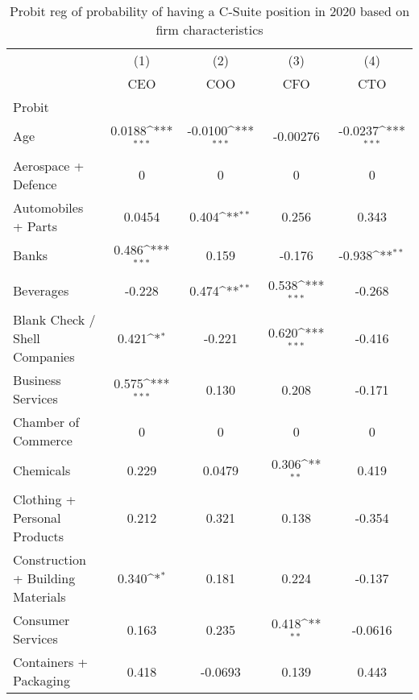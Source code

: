 {
\def\sym#1{\ifmmode^{#1}\else\(^{#1}\)\fi}
\begin{longtable}{l*{4}{c}}
\caption{Probit reg of probability of having a C-Suite position in 2020 based on firm characteristics\label{tab1}}\\
\toprule\endfirsthead\midrule\endhead\midrule\endfoot\endlastfoot
                &\multicolumn{1}{c}{(1)}&\multicolumn{1}{c}{(2)}&\multicolumn{1}{c}{(3)}&\multicolumn{1}{c}{(4)}\\
                &\multicolumn{1}{c}{CEO}&\multicolumn{1}{c}{COO}&\multicolumn{1}{c}{CFO}&\multicolumn{1}{c}{CTO}\\
\midrule
Probit          &                  &                  &                  &                  \\
Age             &   0.0188\sym{***}&  -0.0100\sym{***}& -0.00276         &  -0.0237\sym{***}\\
Aerospace + Defence&        0         &        0         &        0         &        0         \\
Automobiles + Parts&   0.0454         &    0.404\sym{**} &    0.256         &    0.343         \\
Banks           &    0.486\sym{***}&    0.159         &   -0.176         &   -0.938\sym{**} \\
Beverages       &   -0.228         &    0.474\sym{**} &    0.538\sym{***}&   -0.268         \\
Blank Check / Shell Companies&    0.421\sym{*}  &   -0.221         &    0.620\sym{***}&   -0.416         \\
Business Services&    0.575\sym{***}&    0.130         &    0.208         &   -0.171         \\
Chamber of Commerce&        0         &        0         &        0         &        0         \\
Chemicals       &    0.229         &   0.0479         &    0.306\sym{**} &    0.419         \\
Clothing + Personal Products&    0.212         &    0.321         &    0.138         &   -0.354         \\
Construction + Building Materials&    0.340\sym{*}  &    0.181         &    0.224         &   -0.137         \\
Consumer Services&    0.163         &    0.235         &    0.418\sym{**} &  -0.0616         \\
Containers + Packaging&    0.418         &  -0.0693         &    0.139         &    0.443         \\

\end{longtable}}
